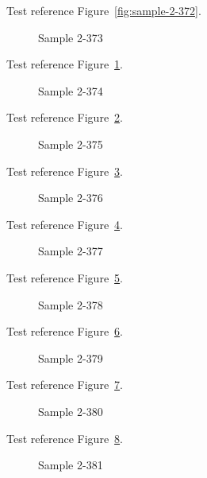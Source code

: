 Test reference Figure~\ref{fig:sample-2-372}.

\begin{figure}[tbhp]
\caption{Sample 2-373}
\label{fig:sample-2-373}
\end{figure}

Test reference Figure~\ref{fig:sample-2-373}.

\begin{figure}[tbhp]
\caption{Sample 2-374}
\label{fig:sample-2-374}
\end{figure}

Test reference Figure~\ref{fig:sample-2-374}.

\begin{figure}[tbhp]
\caption{Sample 2-375}
\label{fig:sample-2-375}
\end{figure}

Test reference Figure~\ref{fig:sample-2-375}.

\begin{figure}[tbhp]
\caption{Sample 2-376}
\label{fig:sample-2-376}
\end{figure}

Test reference Figure~\ref{fig:sample-2-376}.

\begin{figure}[tbhp]
\caption{Sample 2-377}
\label{fig:sample-2-377}
\end{figure}

Test reference Figure~\ref{fig:sample-2-377}.

\begin{figure}[tbhp]
\caption{Sample 2-378}
\label{fig:sample-2-378}
\end{figure}

Test reference Figure~\ref{fig:sample-2-378}.

\begin{figure}[tbhp]
\caption{Sample 2-379}
\label{fig:sample-2-379}
\end{figure}

Test reference Figure~\ref{fig:sample-2-379}.

\begin{figure}[tbhp]
\caption{Sample 2-380}
\label{fig:sample-2-380}
\end{figure}

Test reference Figure~\ref{fig:sample-2-380}.

\begin{figure}[tbhp]
\caption{Sample 2-381}
\label{fig:sample-2-381}
\end{figure}

